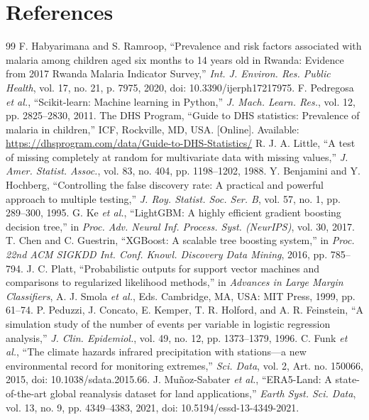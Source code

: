 \documentclass[11pt]{article}
\begin{document}
\section*{References}
\begin{thebibliography}{99}\small
{} F. Habyarimana and S. Ramroop, ``Prevalence and risk factors associated with malaria among children aged six months to 14 years old in Rwanda: Evidence from 2017 Rwanda Malaria Indicator Survey,'' \textit{Int. J. Environ. Res. Public Health}, vol. 17, no. 21, p. 7975, 2020, doi: 10.3390/ijerph17217975.
 F. Pedregosa \textit{et al.}, ``Scikit-learn: Machine learning in Python,'' \textit{J. Mach. Learn. Res.}, vol. 12, pp. 2825--2830, 2011.
 The DHS Program, ``Guide to DHS statistics: Prevalence of malaria in children,'' ICF, Rockville, MD, USA. [Online]. Available: \url{https://dhsprogram.com/data/Guide-to-DHS-Statistics/}
 R. J. A. Little, ``A test of missing completely at random for multivariate data with missing values,'' \textit{J. Amer. Statist. Assoc.}, vol. 83, no. 404, pp. 1198--1202, 1988.
 Y. Benjamini and Y. Hochberg, ``Controlling the false discovery rate: A practical and powerful approach to multiple testing,'' \textit{J. Roy. Statist. Soc. Ser. B}, vol. 57, no. 1, pp. 289--300, 1995.
 G. Ke \textit{et al.}, ``LightGBM: A highly efficient gradient boosting decision tree,'' in \textit{Proc. Adv. Neural Inf. Process. Syst. (NeurIPS)}, vol. 30, 2017.
 T. Chen and C. Guestrin, ``XGBoost: A scalable tree boosting system,'' in \textit{Proc. 22nd ACM SIGKDD Int. Conf. Knowl. Discovery Data Mining}, 2016, pp. 785--794.
 J. C. Platt, ``Probabilistic outputs for support vector machines and comparisons to regularized likelihood methods,'' in \textit{Advances in Large Margin Classifiers}, A. J. Smola \textit{et al.}, Eds. Cambridge, MA, USA: MIT Press, 1999, pp. 61--74.
 P. Peduzzi, J. Concato, E. Kemper, T. R. Holford, and A. R. Feinstein, ``A simulation study of the number of events per variable in logistic regression analysis,'' \textit{J. Clin. Epidemiol.}, vol. 49, no. 12, pp. 1373--1379, 1996.
 C. Funk \textit{et al.}, ``The climate hazards infrared precipitation with stations---a new environmental record for monitoring extremes,'' \textit{Sci. Data}, vol. 2, Art. no. 150066, 2015, doi: 10.1038/sdata.2015.66.
 J. Mu\~noz-Sabater \textit{et al.}, ``ERA5-Land: A state-of-the-art global reanalysis dataset for land applications,'' \textit{Earth Syst. Sci. Data}, vol. 13, no. 9, pp. 4349--4383, 2021, doi: 10.5194/essd-13-4349-2021.

\end{thebibliography}
\end{document}
